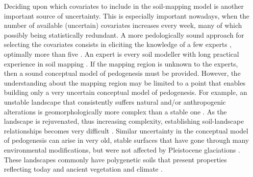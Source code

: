 Deciding upon which covariates to include in the soil-mapping model is another important source of
uncertainty. This is especially important nowadays, when the number of available (uncertain)
covariates increases every week, many of which possibly being statistically redundant. A more
pedologically sound approach for selecting the covariates consists in eliciting the knowledge of a
few experts \cite{LarkEtAl2007a}, optimally more than five \cite{MeyerEtAl2001}. An expert is
every soil modeller with long practical experience in soil mapping \cite{MeyerEtAl2001}.
If the mapping region is unknown to the experts, then a sound conceptual model of pedogenesis must be
provided. However, the understanding about the mapping region may be limited to a point that enables
building only a very uncertain conceptual model of pedogenesis. For example, an unstable landscape that
consistently suffers natural and/or anthropogenic alterations is geomorphologically more complex than
a stable one \cite{Schumm1979}. As the landscape is rejuvenated, thus increasing complexity, establishing
soil-landscape relationships becomes very difficult \cite{StreckEtAl2008}. Similar uncertainty
in the conceptual model of pedogenesis can arise in very old, stable surfaces that have gone
through many environmental modifications, but were not affected by Pleistocene glaciations
\cite{MckenzieEtAl2006}. These landscapes commonly have polygenetic soils that present properties
reflecting today and ancient vegetation and climate \cite{PainEtAl1995,Ker1998}.

